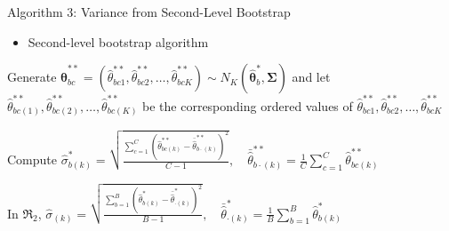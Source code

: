 \documentclass[
  11pt,
  ignorenonframetext,
]{beamer}
\providecommand{\tightlist}{%
  \setlength{\itemsep}{0pt}\setlength{\parskip}{0pt}}
\begin{document}
\begin{frame}{Algorithm 3: Variance from Second-Level Bootstrap}
\label{algorithm-3-variance-from-second-level-bootstrap}
\begin{itemize}[<+->]
\tightlist
\item
  Second-level bootstrap algorithm
\end{itemize}

\begin{algorithmic}[1]
                \State \begin{minipage}[t]{\dimexpr\linewidth-\algorithmicindent} Generate $\hat{\boldsymbol{\theta}}^{**}_{bc} = \left( \hat{\theta}^{**}_{bc1}, \hat{\theta}^{**}_{bc2}, \dots, \hat{\theta}^{**}_{bcK} \right) \sim N_K \left( \hat{\boldsymbol{\theta}}_b^*, \boldsymbol {\Sigma} \right)$ and let $\hat{\theta}^{**}_{bc(1)}, \hat{\theta}^{**}_{bc(2)}, \dots, \hat{\theta}^{**}_{bc(K)}$ be the corresponding ordered values of $\hat{\theta}^{**}_{bc1}, \hat{\theta}^{**}_{bc2}, \dots, \hat{\theta}^{**}_{bcK}$
                \end{minipage}
                \State \begin{minipage}[t]{\dimexpr\linewidth-\algorithmicindent} Compute
                $\displaystyle \hat{\sigma}^*_{b(k)} = \sqrt{\frac{\sum^C_{c=1} \left( \hat \theta^{**}_{bc(k)} - \bar {\hat\theta}^{**}_{b \cdot (k)} \right)^2}{C-1}}, \quad \bar {\hat\theta}^{**}_{b\cdot(k)} = \frac{1}{C} \sum^C_{c=1} {\hat\theta}^{**}_{bc(k)}$
                \end{minipage}
                \EndFor
    \end{algorithmic}

In \(\mathfrak{R}_2\),
\(\displaystyle \hat \sigma_{(k)} = \sqrt{ \frac{\sum^B_{b=1} \left( \hat \theta^*_{b(k)} - \bar {\hat\theta}^*_{\cdot (k)} \right)^2}{B-1}}, \quad \bar {\hat\theta}^*_{\cdot(k)} = \frac{1}{B} \sum^B_{b=1} {\hat\theta}^*_{b(k)}\)

\end{frame}
\end{document}

